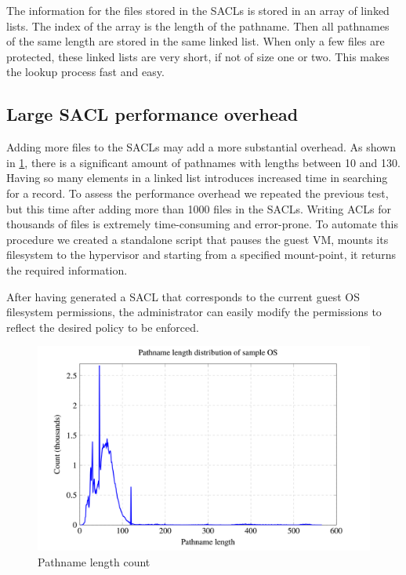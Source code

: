 \par The information for the files stored in the \acp{SACL} is stored in an array of linked lists. The index of the array is the length of the pathname. Then all pathnames of the same length are stored in the same linked list. When only a few files are protected, these linked lists are very short, if not of size one or two. This makes the lookup process fast and easy. 

\subsection{Large \ac{SACL} performance overhead}

\par Adding more files to the \acp{SACL} may add a more substantial overhead. As shown in \ref{fig:pathname_length}, there is a significant amount of pathnames with lengths between 10 and 130. Having so many elements in a linked list introduces increased time in searching for a record. To assess the performance overhead we repeated the previous test, but this time after adding more than 1000 files in the \acp{SACL}. Writing \acp{ACL} for thousands of files is extremely time-consuming and error-prone. To automate this procedure we created a standalone script that pauses the guest \ac{VM}, mounts its filesystem to the hypervisor and starting from a specified mount-point, it returns the required information. 

\par After having generated a \ac{SACL} that corresponds to the current guest \ac{OS} filesystem permissions, the administrator can easily modify the permissions to reflect the desired policy to be enforced. 

\begin{figure}[ht]
	\centering
	\includegraphics[scale=0.45]{images/graph1.png}
	\caption{Pathname length count}
	\label{fig:pathname_length}
\end{figure}


